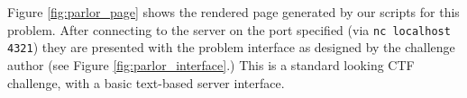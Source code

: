 Figure \ref{fig:parlor_page} shows the rendered page generated by our
scripts for this problem. After connecting to the server on the port
specified (via \texttt{nc localhost 4321}) they are presented with the
problem interface as designed by the challenge author (see Figure
\ref{fig:parlor_interface}.) This is a standard looking CTF challenge,
with a basic text-based server interface.
